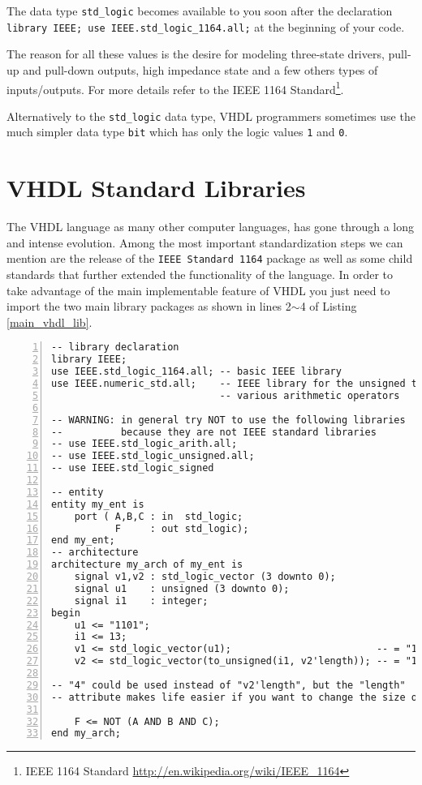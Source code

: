 The data type \texttt{std\_logic} becomes available to you soon after the declaration \texttt{library IEEE; use IEEE.std\_logic\_1164.all;} at the beginning of your code.

The reason for all these values is the desire for modeling three-state drivers, pull-up and pull-down outputs, high impedance state and a few others types of inputs/outputs. For more details refer to the IEEE 1164 Standard\footnote{IEEE 1164 Standard \footnotesize\url{http://en.wikipedia.org/wiki/IEEE_1164}}.

Alternatively to the \texttt{std\_logic} data type, VHDL programmers sometimes use the much simpler data type \texttt{bit} which has only the logic values \texttt{1} and \texttt{0}.

\section{VHDL Standard Libraries}
The VHDL language as many other computer languages, has gone through a long and intense evolution. Among the most important standardization steps we can mention are the release of the \texttt{IEEE Standard 1164} package as well as some child standards that further extended the functionality of the language. In order to take advantage of the main implementable feature of VHDL you just need to import the two main library packages as shown in lines 2$\sim$4 of Listing \ref{main_vhdl_lib}.

\noindent
\begin{minipage}{0.99\linewidth}
\begin{lstlisting}[numbers=left,label=main_vhdl_lib, caption=Typical inclusions of IEEE standard libraries.]
-- library declaration
library IEEE;
use IEEE.std_logic_1164.all; -- basic IEEE library
use IEEE.numeric_std.all;    -- IEEE library for the unsigned type and
                             -- various arithmetic operators

-- WARNING: in general try NOT to use the following libraries 
--          because they are not IEEE standard libraries
-- use IEEE.std_logic_arith.all;
-- use IEEE.std_logic_unsigned.all;
-- use IEEE.std_logic_signed

-- entity
entity my_ent is
	port ( A,B,C : in  std_logic;
	       F     : out std_logic);
end my_ent;
-- architecture
architecture my_arch of my_ent is
    signal v1,v2 : std_logic_vector (3 downto 0);
    signal u1    : unsigned (3 downto 0);
    signal i1    : integer;
begin
    u1 <= "1101";
    i1 <= 13;
    v1 <= std_logic_vector(u1);                         -- = "1101"
    v2 <= std_logic_vector(to_unsigned(i1, v2'length)); -- = "1101"

-- "4" could be used instead of "v2'length", but the "length"
-- attribute makes life easier if you want to change the size of v2

	F <= NOT (A AND B AND C);	
end my_arch;
\end{lstlisting}
\end{minipage}

